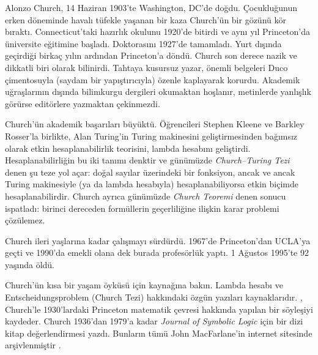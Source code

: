 \documentclass[../../../include/open-logic-section]{subfiles}
\begin{document}



Alonzo Church, 14 Haziran 1903'te Washington, DC'de doğdu. Çocukluğunun
erken döneminde havalı tüfekle yaşanan bir kaza Church'ün bir gözünü kör
bıraktı. Connecticut'taki hazırlık okulunu 1920'de bitirdi ve aynı yıl
Princeton'da üniversite eğitimine başladı. Doktorasını 1927'de tamamladı.
Yurt dışında geçirdiği birkaç yılın ardından Princeton'a döndü. Church son
derece nazik ve dikkatli biri olarak bilinirdi. Tahtaya kusursuz yazar,
önemli belgeleri Duco çimentosuyla (saydam bir yapıştırıcıyla) özenle
kaplayarak korurdu. Akademik uğraşlarının dışında bilimkurgu dergileri
okumaktan hoşlanır, metinlerde yanlışlık görürse editörlere yazmaktan
çekinmezdi.

Church'ün akademik başarıları büyüktü. Öğrencileri Stephen Kleene ve
Barkley Rosser'la birlikte, Alan Turing'in Turing makinesini geliştirmesinden
bağımsız olarak etkin hesaplanabilirlik teorisini, lambda hesabını
geliştirdi. Hesaplanabilirliğin bu iki tanımı denktir ve günümüzde
\emph{Church--Turing Tezi} denen şu teze yol açar: doğal sayılar üzerindeki
bir fonksiyon, ancak ve ancak Turing makinesiyle (ya da lambda hesabıyla)
hesaplanabiliyorsa etkin biçimde hesaplanabilirdir. Church ayrıca günümüzde
\emph{Church Teoremi} denen sonucu ispatladı: birinci dereceden formüllerin
geçerliliğine ilişkin karar problemi çözülemez.

Church ileri yaşlarına kadar çalışmayı sürdürdü. 1967'de Princeton'dan
UCLA'ya geçti ve 1990'da emekli olana dek burada profesörlük yaptı. 1
Ağustos 1995'te 92 yaşında öldü.

\begin{reading}
Church'ün kısa bir yaşam öyküsü için \citet{EndertonND} kaynağına bakın.
Lambda hesabı ve Entscheidungsproblem (Church Tezi) hakkındaki özgün
yazıları \citet{Church1936,Church1936a} kaynaklarıdır.
\citet{Aspray1984}, Church'le 1930'lardaki Princeton matematik çevresi
hakkında yapılan bir söyleşiyi kaydeder. Church 1936'dan 1979'a kadar
\emph{Journal of Symbolic Logic} için bir dizi kitap değerlendirmesi yazdı.
Bunların tümü John MacFarlane'in internet sitesinde arşivlenmiştir
\citep{MacFarlane2015}.
\end{reading}
\end{document}
